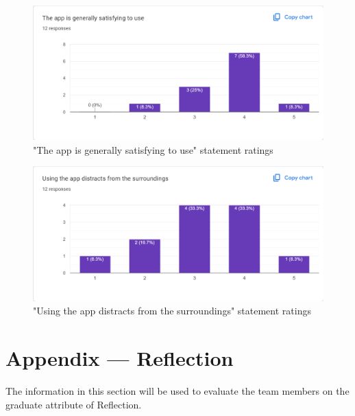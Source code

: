 \documentclass[12pt, titlepage]{article}
\begin{document}
\begin{figure}[htbp]
  \caption{"The app is generally satisfying to use" statement ratings}
  \centerline{\includegraphics[scale=0.35]{./Images/Q6.png}}
  \label{fig:Social}
\end{figure}

\begin{figure}[htbp]
  \caption{"Using the app distracts from the surroundings" statement ratings}
  \centerline{\includegraphics[scale=0.35]{./Images/Q7.png}}
  \label{fig:Enjoy}
\end{figure}

\newpage{}

\section*{Appendix --- Reflection}

The information in this section will be used to evaluate the team members on the
graduate attribute of Reflection.


\end{document}
